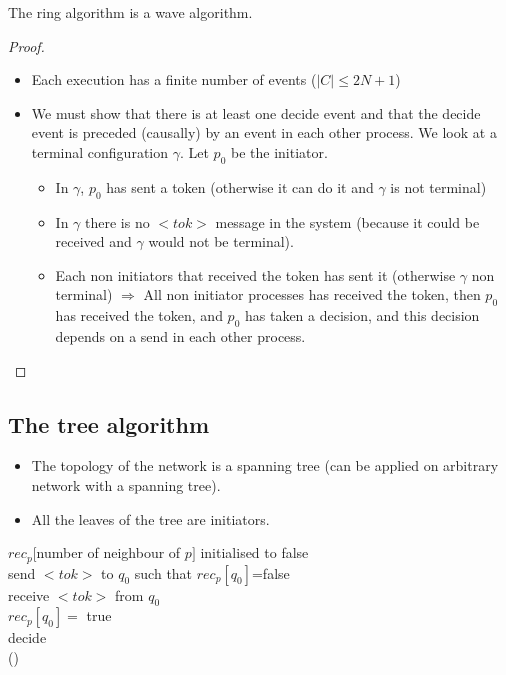 \begin{thm}
The ring algorithm is a wave algorithm.
\end{thm}

\begin{proof}
\begin{itemize}
\item Each execution has a finite number of events ($|C|\leq 2N+1$)
\item We must show that there is at least one decide event and that the decide event is preceded (causally) by an event in each other process. We look at a terminal configuration $\gamma$. Let $p_0$ be the initiator.
\begin{itemize}
\item In $\gamma$, $p_0$ has sent a token (otherwise it can do it and $\gamma$ is not terminal)
\item In $\gamma$ there is no $<tok>$ message in the system (because it could be received and $\gamma$ would not be terminal).
\item Each non initiators that received the token has sent it (otherwise $\gamma$ non terminal) $\Rightarrow$ All non initiator processes has received the token, then $p_0$ has received the token, and $p_0$ has taken a decision, and this decision depends on a send in each other process.
\end{itemize}
\end{itemize}
\end{proof}

\subsection{The tree algorithm}
\begin{itemize}
\item The topology of the network is a spanning tree (can be applied on arbitrary network with a spanning tree).
\item All the leaves of the tree are initiators.
\end{itemize}

\begin{algorithm}
$rec_p[$number of neighbour of $p]$ initialised to false\\
send $<tok>$ to $q_0$ such that $rec_p[q_0]$=false\\
receive $<tok>$ from $q_0$\\
$rec_p[q_0]=$ true\\
decide\\
() 
\end{algorithm}


